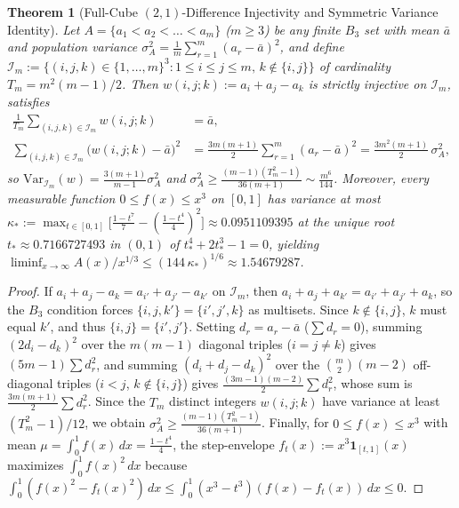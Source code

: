 \documentclass[11pt,a4paper]{article}
\newtheorem{theorem}{Theorem}[section]
\theoremstyle{remark}
\begin{document}
\begin{theorem}[Full-Cube $(2,1)$-Difference Injectivity and Symmetric Variance Identity]
Let $A = \{a_1 < a_2 < \dots < a_m\}$ ($m \ge 3$) be any finite $B_3$ set with mean $\bar{a}$ and population variance $\sigma_A^2 = \frac{1}{m}\sum_{r=1}^m (a_r - \bar{a})^2$, and define $\mathcal{I}_m := \{(i, j, k) \in \{1, \dots, m\}^3 : 1 \le i \le j \le m,\, k \notin \{i, j\}\}$ of cardinality $T_m = m^2(m-1)/2$. Then $w(i, j; k) := a_i + a_j - a_k$ is strictly injective on $\mathcal{I}_m$, satisfies
\begin{align*}
  \frac{1}{T_m} \sum_{(i,j,k) \in \mathcal{I}_m} w(i, j; k) &= \bar{a}, \\
  \sum_{(i,j,k) \in \mathcal{I}_m} \bigl(w(i, j; k) - \bar{a}\bigr)^2 &= \frac{3 m (m + 1)}{2} \sum_{r=1}^m (a_r - \bar{a})^2 = \frac{3 m^2 (m + 1)}{2}\, \sigma_A^2,
\end{align*}
so $\mathrm{Var}_{\mathcal{I}_m}(w) = \frac{3(m+1)}{m-1}\sigma_A^2$ and $\sigma_A^2 \ge \frac{(m-1)(T_m^2 - 1)}{36(m+1)} \sim \frac{m^6}{144}$. Moreover, every measurable function $0 \le f(x) \le x^3$ on $[0, 1]$ has variance at most $\kappa_* := \max_{t \in [0,1]} \bigl[\frac{1-t^7}{7} - (\frac{1-t^4}{4})^2\bigr] \approx 0.0951109395$ at the unique root $t_* \approx 0.7166727493$ in $(0, 1)$ of $t_*^4 + 2 t_*^3 - 1 = 0$, yielding $\liminf_{x\to\infty} A(x)/x^{1/3} \le (144\,\kappa_*)^{1/6} \approx 1.54679287$.
\end{theorem}

\begin{proof}
If $a_i + a_j - a_k = a_{i'} + a_{j'} - a_{k'}$ on $\mathcal{I}_m$, then $a_i + a_j + a_{k'} = a_{i'} + a_{j'} + a_k$, so the $B_3$ condition forces $\{i, j, k'\} = \{i', j', k\}$ as multisets. Since $k \notin \{i, j\}$, $k$ must equal $k'$, and thus $\{i, j\} = \{i', j'\}$. Setting $d_r = a_r - \bar{a}$ ($\sum d_r = 0$), summing $(2 d_i - d_k)^2$ over the $m(m-1)$ diagonal triples ($i = j \ne k$) gives $(5m - 1)\sum d_r^2$, and summing $(d_i + d_j - d_k)^2$ over the $\binom{m}{2}(m - 2)$ off-diagonal triples ($i < j$, $k \notin \{i, j\}$) gives $\frac{(3m-1)(m-2)}{2}\sum d_r^2$, whose sum is $\frac{3m(m+1)}{2}\sum d_r^2$. Since the $T_m$ distinct integers $w(i, j; k)$ have variance at least $(T_m^2 - 1)/12$, we obtain $\sigma_A^2 \ge \frac{(m-1)(T_m^2-1)}{36(m+1)}$. Finally, for $0 \le f(x) \le x^3$ with mean $\mu = \int_0^1 f(x)\,dx = \frac{1-t^4}{4}$, the step-envelope $f_t(x) := x^3\mathbf{1}_{[t,1]}(x)$ maximizes $\int_0^1 f(x)^2\,dx$ because $\int_0^1 (f(x)^2 - f_t(x)^2)\,dx \le \int_0^1 (x^3 - t^3)(f(x) - f_t(x))\,dx \le 0$.
\end{proof}
\end{document}
